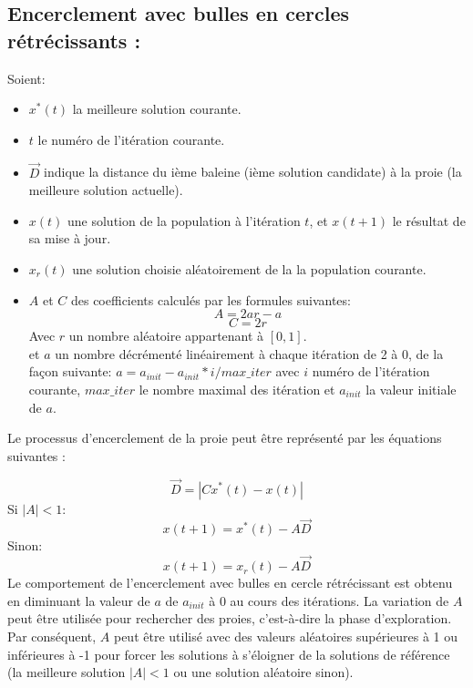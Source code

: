 \documentclass[12pt]{article}
\begin{document}
\subsection{Encerclement avec bulles en cercles rétrécissants :}
Soient:
\begin{itemize}
    \item \(x^*(t)\) la meilleure solution courante.
    \item \(t\) le numéro de l'itération courante.
    \item \(\vec{D}\) indique la distance du ième baleine (ième solution candidate) à la proie (la meilleure solution actuelle).
    \item \(x(t)\) une solution de la population à l'itération \(t\), et \(x(t+1)\) le résultat de sa mise à jour.
    \item \(x_r(t)\) une solution choisie aléatoirement de la la population courante.
    \item \(A\) et \(C\) des coefficients calculés par les formules suivantes:
    \[A = 2ar-a\] 
    \[C = 2r\] 
    Avec \(r\) un nombre aléatoire appartenant à \([0,1]\).
    \\ et \(a\) un nombre décrémenté linéairement à chaque itération de 2 à 0, de la façon suivante:
    \(a =  a_{init} - a_{init}*i/max\_iter\) avec \(i\) numéro de l’itération courante, \(max\_iter\) le nombre maximal des itération et \(a_{init}\) la valeur initiale de \(a\).
\end{itemize}
Le processus d’encerclement de la proie peut être représenté par les équations suivantes :

\begin{equation*}
    \vec{D} = |Cx^*(t) - x(t)|
\end{equation*}
Si \(|A| < 1\):
\begin{equation}
    x(t+1) = x^*(t) - A\vec{D}
\end{equation}
Sinon:
\begin{equation}
    x(t+1) = x_r(t) - A\vec{D}
\end{equation}
Le comportement de l’encerclement avec bulles en cercle rétrécissant est obtenu en diminuant la valeur de \(a\) de \(a_{init}\) à 0 au cours des itérations. La variation de \(A\) peut être utilisée pour rechercher des proies, c'est-à-dire la phase d'exploration. Par conséquent, \(A\) peut être utilisé avec des valeurs aléatoires supérieures à 1 ou inférieures à -1 pour forcer les solutions à s'éloigner de la solutions de référence (la meilleure solution \(|A| < 1\) ou une solution aléatoire sinon).
\end{document}
